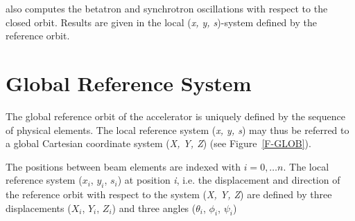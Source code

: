 \madx also computes the betatron and synchrotron oscillations with respect
to the closed orbit. Results are given in the local (\textit{x, y,
  s})-system defined by the reference orbit. 


\section{Global Reference System}
\label{sec:global-ref}

The global reference orbit of the accelerator is
uniquely defined by the sequence of physical elements. The local
reference system (\textit{x, y, s}) may thus be
referred to a global Cartesian coordinate system (\textit{X, Y, Z}) 
(see Figure~\ref{F-GLOB}). 

The positions between beam elements are indexed with $i=0,\ldots n$. 
The local reference system  ({$x_i$, $y_i$, $s_i$}) at position
\textit{i}, i.e. the displacement and direction of the reference orbit
with respect to the system (\textit{X, Y, Z}) are
defined by three displacements  ($X_i$, $Y_i$, $Z_i$) and three angles
($\theta_i$, $\phi_i$, $\psi_i$) 


